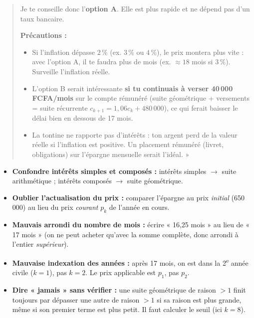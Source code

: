 \documentclass[11pt]{article}
\begin{document}
\begin{exoresolu}
\begin{quote}
Je te conseille donc l'\textbf{option A}. Elle est plus rapide et ne dépend pas d'un taux bancaire.

\textbf{Précautions :}
\begin{itemize}
\item Si l'inflation dépasse $2\,\%$ (ex. $3\,\%$ ou $4\,\%$), le prix montera plus vite : avec l'option A, il te faudra plus de mois (ex. $\approx 18$ mois si $3\,\%$). Surveille l'inflation réelle.
\item L'option B serait intéressante \textbf{si tu continuais à verser 40\,000 FCFA/mois} sur le compte rémunéré (suite géométrique + versements = suite récurrente $c_{k+1} = 1{,}06 c_k + 480\,000$), ce qui ferait baisser le délai bien en dessous de 17 mois.
\item La tontine ne rapporte pas d'intérêts : ton argent perd de la valeur réelle si l'inflation est positive. Un placement rémunéré (livret, obligations) sur l'épargne mensuelle serait l'idéal. »
\end{itemize}
\end{quote}
\end{exoresolu}

\begin{attention}
\begin{itemize}
\item \textbf{Confondre intérêts simples et composés :} intérêts simples $\rightarrow$ suite arithmétique ; intérêts composés $\rightarrow$ suite géométrique.
\item \textbf{Oublier l'actualisation du prix :} comparer l'épargne au prix \emph{initial} (650\,000) au lieu du prix \emph{courant} $p_k$ de l'année en cours.
\item \textbf{Mauvais arrondi du nombre de mois :} écrire « 16,25 mois » au lieu de « 17 mois » (on ne peut acheter qu'avec la somme complète, donc arrondi à l'entier \emph{supérieur}).
\item \textbf{Mauvaise indexation des années :} après 17 mois, on est dans la 2\textsuperscript{e} année civile ($k=1$), pas $k=2$. Le prix applicable est $p_1$, pas $p_2$.
\item \textbf{Dire « jamais » sans vérifier :} une suite géométrique de raison $>1$ finit toujours par dépasser une autre de raison $>1$ si sa raison est plus grande, même si son premier terme est plus petit. Il faut calculer le seuil (ici $k=8$).
\end{itemize}
\end{attention}
\end{document}

